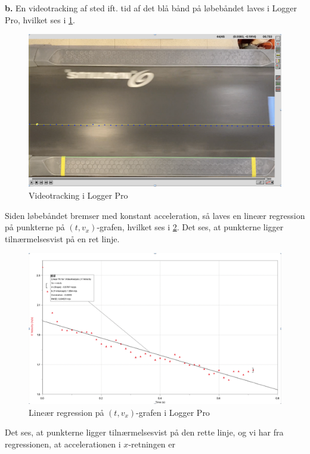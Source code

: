 \documentclass{report}
\begin{document}
\textbf{b.}
En videotracking af sted ift. tid af det blå bånd på løbebåndet laves i Logger Pro, hvilket ses i \cref{fig:video}.
\begin{figure}[H]
\begin{center}
  \includegraphics[width=\textwidth]{video.png}
\end{center}
\caption{Videotracking i Logger Pro}
\label{fig:video}
\end{figure}
Siden løbebåndet bremser med konstant acceleration, så laves en lineær regression på punkterne på $(t,v_x)$-grafen, hvilket ses i \cref{fig:tv}.
Det ses, at punkterne ligger tilnærmelsesvist på en ret linje.
\begin{figure}[H]
\begin{center}
  \includegraphics[width=\textwidth]{tv.png}
\end{center}
  \caption{Lineær regression på $(t,v_x)$-grafen i Logger Pro}
\label{fig:tv}
\end{figure}
Det ses, at punkterne ligger tilnærmelsesvist på den rette linje, og vi har fra regressionen, at accelerationen i $x$-retningen er
\end{document}
